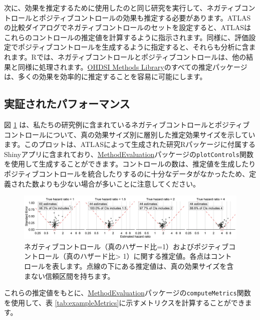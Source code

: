 \documentclass[
  11pt]{book}
\theoremstyle{definition}
\theoremstyle{definition}
\theoremstyle{definition}
\theoremstyle{definition}
\theoremstyle{remark}
\begin{document}
次に、効果を推定するために使用したのと同じ研究を実行して、ネガティブコントロールとポジティブコントロールの効果も推定する必要があります。ATLASの比較ダイアログでネガティブコントロールのセットを設定すると、ATLASはこれらのコントロールの推定値を計算するように指示されます。同様に、評価設定でポジティブコントロールを生成するように指定すると、それらも分析に含まれます。Rでは、ネガティブコントロールとポジティブコントロールは、他の結果と同様に処理されます。\href{https://ohdsi.github.io/MethodsLibrary/}{OHDSI Methods Library}のすべての推定パッケージは、多くの効果を効率的に推定することを容易に可能にします。

\subsection{実証されたパフォーマンス}\label{ux5b9fux8a3cux3055ux308cux305fux30d1ux30d5ux30a9ux30fcux30deux30f3ux30b9}

図 \ref{fig:controls} は、私たちの研究例に含まれているネガティブコントロールとポジティブコントロールについて、真の効果サイズ別に層別した推定効果サイズを示しています。このプロットは、ATLASによって生成された研究Rパッケージに付属するShinyアプリに含まれており、\href{https://ohdsi.github.io/MethodEvaluation/}{MethodEvaluation}パッケージの\texttt{plotControls}関数を使用して生成することができます。コントロールの数は、推定値を生成したりポジティブコントロールを統合したりするのに十分なデータがなかったため、定義された数よりも少ない場合が多いことに注意してください。

\begin{figure}

{\centering \includegraphics[width=1\linewidth]{images/MethodValidity/controls} 

}

\caption{ネガティブコントロール（真のハザード比=1）およびポジティブコントロール（真のハザード比> 1）に関する推定値。各点はコントロールを表します。点線の下にある推定値は、真の効果サイズを含まない信頼区間を持ちます。}\label{fig:controls}
\end{figure}

これらの推定値をもとに、\href{https://ohdsi.github.io/MethodEvaluation/}{MethodEvaluation}パッケージの\texttt{computeMetrics}関数を使用して、表 \ref{tab:exampleMetrics}に示すメトリクスを計算することができます。
\end{document}
